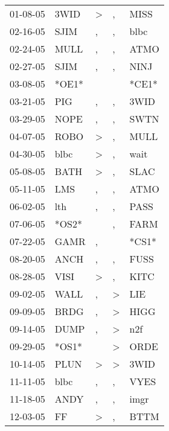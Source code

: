 \begin{supertabular}{lllll}
 01-08-05 &   3WID &     \textgreater &                , &   MISS \\
 02-16-05 &   SJIM &                , &                , &   blbc \\
 02-24-05 &   MULL &                , &                , &   ATMO \\
 02-27-05 &   SJIM &                , &                , &   NINJ \\
 03-08-05 &  *OE1* &                  &                  &  *CE1* \\
 03-21-05 &    PIG &                , &                , &   3WID \\
 03-29-05 &   NOPE &                , &                , &   SWTN \\
 04-07-05 &   ROBO &     \textgreater &                , &   MULL \\
 04-30-05 &   blbc &     \textgreater &                , &   wait \\
 05-08-05 &   BATH &     \textgreater &                , &   SLAC \\
 05-11-05 &    LMS &                , &                , &   ATMO \\
 06-02-05 &    lth &                , &                , &   PASS \\
 07-06-05 &  *OS2* &                  &                , &   FARM \\
 07-22-05 &   GAMR &                , &                  &  *CS1* \\
 08-20-05 &   ANCH &                , &                , &   FUSS \\
 08-28-05 &   VISI &     \textgreater &                , &   KITC \\
 09-02-05 &   WALL &                , &     \textgreater &    LIE \\
 09-09-05 &   BRDG &                , &     \textgreater &   HIGG \\
 09-14-05 &   DUMP &                , &     \textgreater &    n2f \\
 09-29-05 &  *OS1* &                  &     \textgreater &   ORDE \\
 10-14-05 &   PLUN &     \textgreater &     \textgreater &   3WID \\
 11-11-05 &   blbc &                , &                , &   VYES \\
 11-18-05 &   ANDY &                , &                , &   imgr \\
 12-03-05 &     FF &     \textgreater &                , &   BTTM \\

\end{supertabular}
